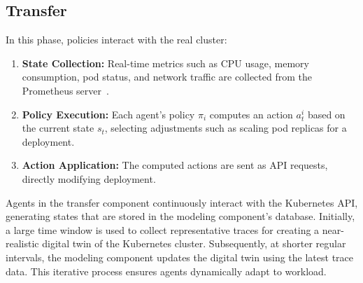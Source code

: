 \documentclass[conference]{IEEEtran}
\begin{document}



\subsection{Transfer}
\label{sec:transfer}


In this phase, policies interact with the real cluster:
\begin{enumerate}
    \item \textbf{State Collection:} Real-time metrics such as CPU usage, memory consumption, pod status, and network traffic are collected from the Prometheus server~\cite{prometheus}.
    \item \textbf{Policy Execution:} Each agent's policy $\pi_i$ computes an action $a_t^i$ based on the current state $s_t$, selecting adjustments such as scaling pod replicas for a deployment.
    \item \textbf{Action Application:} The computed actions are sent as API requests, directly modifying deployment.
\end{enumerate}

Agents in the transfer component continuously interact with the Kubernetes API, generating states that are stored in the modeling component's database. Initially, a large time window is used to collect representative traces for creating a near-realistic digital twin of the Kubernetes cluster. Subsequently, at shorter regular intervals, the modeling component updates the digital twin using the latest trace data. This iterative process ensures agents dynamically adapt to workload.
\end{document}
